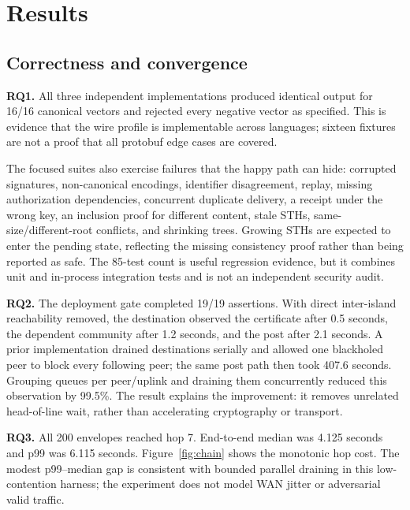 \documentclass[sigconf,anonymous]{acmart}
\begin{document}
\section{Results}
\label{sec:results}

\subsection{Correctness and convergence}

\textbf{RQ1.} All three independent implementations produced identical output for 16/16 canonical
vectors and rejected every negative vector as specified. This is evidence that the wire profile is
implementable across languages; sixteen fixtures are not a proof that all protobuf edge cases are
covered.

The focused suites also exercise failures that the happy path can hide: corrupted signatures,
non-canonical encodings, identifier disagreement, replay, missing authorization dependencies,
concurrent duplicate delivery, a receipt under the wrong key, an inclusion proof for different
content, stale STHs, same-size/different-root conflicts, and shrinking trees. Growing STHs are expected
to enter the pending state, reflecting the missing consistency proof rather than being reported as
safe. The 85-test count is useful regression evidence, but it combines unit and in-process integration
tests and is not an independent security audit.

\textbf{RQ2.} The deployment gate completed 19/19 assertions. With direct inter-island reachability
removed, the destination observed the certificate after 0.5 seconds, the dependent community after
1.2 seconds, and the post after 2.1 seconds. A prior implementation drained destinations serially and
allowed one blackholed peer to block every following peer; the same post path then took 407.6 seconds.
Grouping queues per peer/uplink and draining them concurrently reduced this observation by 99.5\%.
The result explains the improvement: it removes unrelated head-of-line wait, rather than accelerating
cryptography or transport.

\textbf{RQ3.} All 200 envelopes reached hop 7. End-to-end median was 4.125 seconds and p99 was 6.115
seconds. Figure~\ref{fig:chain} shows the monotonic hop cost. The modest p99--median gap is consistent
with bounded parallel draining in this low-contention harness; the experiment does not model WAN
jitter or adversarial valid traffic.
\end{document}
